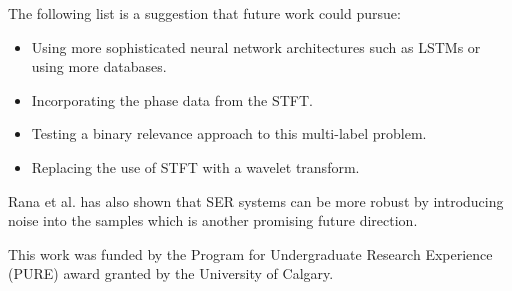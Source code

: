 The following list is a suggestion that future work could pursue:
\begin{itemize}
	\item Using more sophisticated neural network architectures such as LSTMs or using more databases.
	\item Incorporating the phase data from the STFT.
	\item Testing a binary relevance approach to this multi-label problem.
	\item Replacing the use of STFT with a wavelet transform.
\end{itemize}
Rana et al. \cite{Rana2016} has also shown that SER systems can be more robust by introducing noise into the samples which is another promising future direction.

\begin{acks}
This work was funded by the Program for Undergraduate Research Experience (PURE) award granted by the University of Calgary.
\end{acks}
